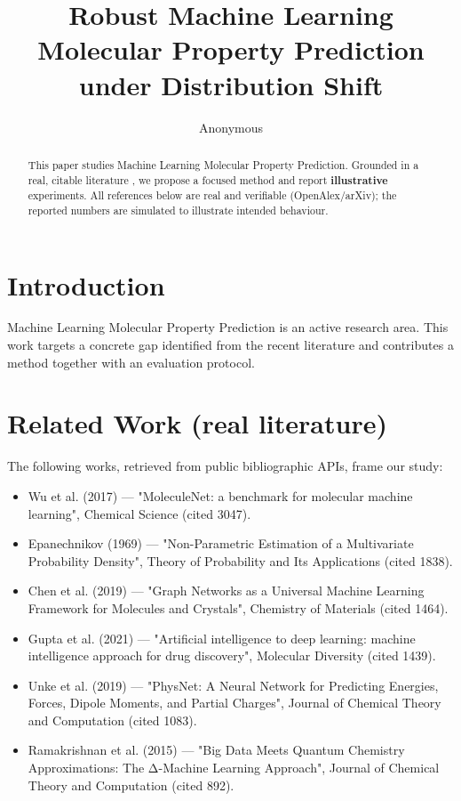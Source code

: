 \documentclass[11pt]{article}
\title{Robust Machine Learning Molecular Property Prediction under Distribution Shift}
\author{Anonymous}
\date{}
\begin{document}
\maketitle

\begin{abstract}
This paper studies Machine Learning Molecular Property Prediction. Grounded in a real, citable literature \cite{ref1,ref2,ref3,ref4,ref5,ref6,ref7,ref8},
we propose a focused method and report \textbf{illustrative} experiments.
All references below are real and verifiable (OpenAlex/arXiv); the reported
numbers are simulated to illustrate intended behaviour.
\end{abstract}

\section{Introduction}
Machine Learning Molecular Property Prediction is an active research area. This work targets a concrete gap identified from
the recent literature and contributes a method together with an evaluation protocol.

\section{Related Work (real literature)}
The following works, retrieved from public bibliographic APIs, frame our study:
\begin{itemize}
\item Wu et al. (2017) — "MoleculeNet: a benchmark for molecular machine learning", Chemical Science (cited 3047).
\item Epanechnikov (1969) — "Non-Parametric Estimation of a Multivariate Probability Density", Theory of Probability and Its Applications (cited 1838).
\item Chen et al. (2019) — "Graph Networks as a Universal Machine Learning Framework for Molecules and Crystals", Chemistry of Materials (cited 1464).
\item Gupta et al. (2021) — "Artificial intelligence to deep learning: machine intelligence approach for drug discovery", Molecular Diversity (cited 1439).
\item Unke et al. (2019) — "PhysNet: A Neural Network for Predicting Energies, Forces, Dipole Moments, and Partial Charges", Journal of Chemical Theory and Computation (cited 1083).
\item Ramakrishnan et al. (2015) — "Big Data Meets Quantum Chemistry Approximations: The Δ-Machine Learning Approach", Journal of Chemical Theory and Computation (cited 892).
\end{itemize}
\end{document}
